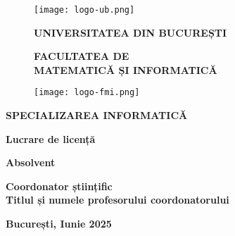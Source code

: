 \begin{titlepage}


\begin{figure}[!htb]
    \centering
    \begin{minipage}{0.2\textwidth}
        \texttt{[image: logo-ub.png]}
    \end{minipage}
    \begin{minipage}{0.5\textwidth}
        \large
        \vspace{0.2cm}
        \begin{center}
            \textbf{UNIVERSITATEA DIN BUCUREȘTI}
        \end{center}
        \vspace{0.3cm}
        \begin{center}
            \textbf{
                FACULTATEA DE \\
                MATEMATICĂ ȘI INFORMATICĂ
            }
        \end{center}
    \end{minipage}
    \begin{minipage}{0.2\textwidth}
        \texttt{[image: logo-fmi.png]}
    \end{minipage}
\end{figure}

\begin{center}
\textbf{SPECIALIZAREA INFORMATICĂ}
\end{center}

\vspace{1cm}

\begin{center}
\Large \textbf{Lucrare de licență}
\end{center}

\begin{center}
\huge \textbf{\MakeUppercase{\@title}}
\end{center}

\vspace{3cm}

\begin{center}
\large \textbf{Absolvent \\ \@author}
\end{center}

\vspace{0.25cm}

\begin{center}
\large \textbf{Coordonator științific \\ Titlul și numele profesorului coordonatorului}
\end{center}

\vspace{2cm}

\begin{center}
\Large \textbf{București, Iunie 2025}
\end{center}
\end{titlepage}
